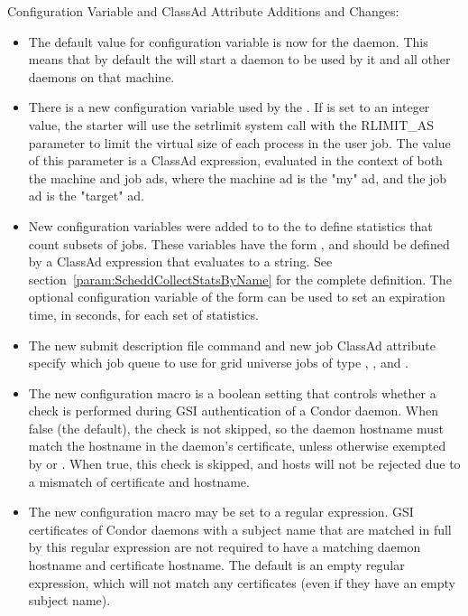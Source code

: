 \noindent Configuration Variable and ClassAd Attribute Additions and Changes:

\begin{itemize}

\item The default value for configuration variable 
is now  for the  daemon.  
This means that by
default the  will start a  daemon to be used 
by it and all other daemons on that machine.

\item There is a new configuration variable used by the .
If  is set to an integer value, the starter
will use the setrlimit system call with the RLIMIT\_AS parameter to
limit the virtual size of each process in the user job.  The value of
this parameter is a ClassAd expression, evaluated in the context of both
the machine and job ads, where the machine ad is the "my" ad, and the job 
ad is the "target" ad.

\item New configuration variables were added to to the  to
define statistics that count subsets of jobs. 
These variables have the form ,
and should be defined by a ClassAd expression that evaluates to a string.
See section~\ref{param:ScheddCollectStatsByName}
for the complete definition.
The optional configuration variable of the form
 can be used to set an expiration time,
in seconds, for each set of statistics.

\item The new  submit description file command
and new job ClassAd attribute  specify which job
queue to use for grid universe jobs of type
, , and .

\item The new configuration macro  is
a boolean setting that controls whether a check is performed during
GSI authentication of a Condor daemon.  When false (the default),
the check is not skipped, so the daemon hostname must match the
hostname in the daemon's certificate, unless otherwise exempted
by  or
.
When true, this check is skipped, and hosts will not be rejected
due to a mismatch of certificate and hostname.

\item The new configuration macro
 may be set to a
regular expression.  GSI certificates of Condor daemons with a
subject name that are matched in full by this regular expression
are not required to have a matching daemon hostname and certificate
hostname.  The default is an empty regular expression, which will
not match any certificates (even if they have an empty subject name).

\end{itemize}

